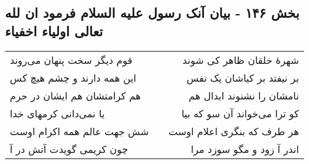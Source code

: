 \begin{center}
\section*{بخش ۱۴۶ - بیان آنک رسول علیه السلام فرمود ان لله تعالی اولیاء اخفیاء}
\label{sec:sh146}
\begin{longtable}{l p{0.5cm} r}
قوم دیگر سخت پنهان می‌روند
&&
شهرهٔ خلقان ظاهر کی شوند
\\
این همه دارند و چشم هیچ کس
&&
بر نیفتد بر کیاشان یک نفس
\\
هم کرامتشان هم ایشان در حرم
&&
نامشان را نشنوند ابدال هم
\\
یا نمی‌دانی کرمهای خدا
&&
کو ترا می‌خواند آن سو که بیا
\\
شش جهت عالم همه اکرام اوست
&&
هر طرف که بنگری اعلام اوست
\\
چون کریمی گویدت آتش در آ
&&
اندر آ زود و مگو سوزد مرا
\\
\end{longtable}
\end{center}
